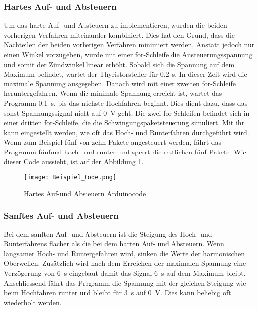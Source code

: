 \subsubsection*{Hartes Auf- und Absteuern}
Um das harte Auf- und Absteuern zu implementieren, wurden die beiden vorherigen Verfahren miteinander kombiniert. Dies hat den Grund, dass die Nachteilen der beiden vorherigen Verfahren minimiert werden. Anstatt jedoch nur einen Winkel vorzugeben, wurde mit einer for-Schleife die Ansteuerungsspannung und somit der Zündwinkel linear erhöht. Sobald sich die Spannung auf dem Maximum befindet, wartet der Thyristorsteller für \SI{0.2}{s}. In dieser Zeit wird die maximale Spannung ausgegeben. Danach wird mit einer zweiten for-Schleife heruntergefahren. Wenn die minimale Spannung erreicht ist, wartet das Programm \SI{0.1}{s}, bis das nächste Hochfahren beginnt. Dies dient dazu, dass das sonst Spannungssignal nicht auf \SI{0}{V} geht. Die zwei for-Schleifen befindet sich in einer dritten for-Schleife, die die Schwingungspaketsteuerung simuliert. Mit ihr kann eingestellt werden, wie oft das Hoch- und Runterfahren durchgeführt wird. Wenn zum Beispiel fünf von zehn Pakete angesteuert werden, fährt das Programm fünfmal hoch- und runter und sperrt die restlichen fünf Pakete. Wie dieser Code aussieht, ist auf der Abbildung \ref{fig:Beispielcode}.
\begin{figure}[ht!]
	\centering
	\texttt{[image: Beispiel\_Code.png]}	
	\caption{Hartes Auf-und Absteuern Arduinocode}\label{fig:Beispielcode}
\end{figure}

\subsubsection*{Sanftes Auf- und Absteuern}
Bei dem sanften Auf- und Absteuern ist die Steigung des Hoch- und Runterfahrens flacher als die bei dem harten Auf- und Absteuern. Wenn langsamer Hoch- und Runtergefahren wird, sinken die Werte der harmonischen Oberwellen. Zusätzlich wird nach dem Erreichen der maximalen Spannung eine Verzögerung von \SI{6}{s} eingebaut damit das Signal \SI{6}{s} auf dem Maximum bleibt. Anschliessend fährt das Programm die Spannung mit der gleichen Steigung wie beim Hochfahren runter und bleibt für \SI{3}{s} auf \SI{0}{V}. Dies kann beliebig oft wiederholt werden.


